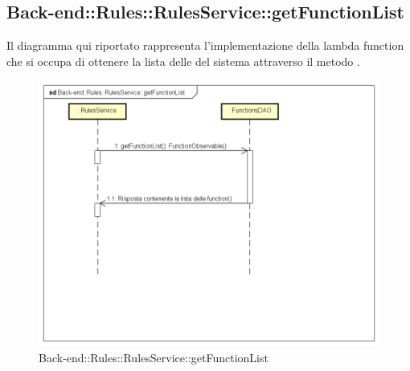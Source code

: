 \subsection{Back-end::Rules::RulesService::getFunctionList}
Il diagramma qui riportato rappresenta l'implementazione della lambda function che si occupa di ottenere la lista delle  del sistema attraverso il metodo .
 \begin{figure}[h] \centering \includegraphics[width=\textwidth,height=\textheight,keepaspectratio]{images/diagrams/back-end/Ufficial_Backend/Back-endRulesRulesServicegetFunctionList.png} 	\caption{Back-end::Rules::RulesService::getFunctionList}
\end{figure}
\newpage

